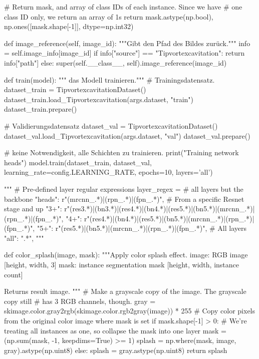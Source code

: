         # Return mask, and array of class IDs of each instance. Since we have
        # one class ID only, we return an array of 1s
        return mask.astype(np.bool), np.ones([mask.shape[-1]], dtype=np.int32)

    def image_reference(self, image_id):
        """Gibt den Pfad des Bildes zurück."""
        info = self.image_info[image_id]
        if info["source"] == "Tipvortexcavitation":
            return info["path"]
        else:
            super(self.__class__, self).image_reference(image_id)

   
def train(model):
    """ das Modell trainieren."""
    # Trainingsdatensatz.
    dataset_train = TipvortexcavitationDataset()
    dataset_train.load_Tipvortexcavitation(args.dataset, "train")
    dataset_train.prepare()

    # Validierungsdatensatz
    dataset_val = TipvortexcavitationDataset()
    dataset_val.load_Tipvortexcavitation(args.dataset, "val")
    dataset_val.prepare()

    
    
    
    
    # keine Notwendigkeit, alle Schichten zu trainieren. 
    print("Training network heads")
    model.train(dataset_train, dataset_val,
                learning_rate=config.LEARNING_RATE,
                epochs=10,
                layers='all')
    
    """
    # Pre-defined layer regular expressions
        layer_regex = {
            # all layers but the backbone
            "heads": r"(mrcnn\_.*)|(rpn\_.*)|(fpn\_.*)",
            # From a specific Resnet stage and up
            "3+": r"(res3.*)|(bn3.*)|(res4.*)|(bn4.*)|(res5.*)|(bn5.*)|(mrcnn\_.*)|(rpn\_.*)|(fpn\_.*)",
            "4+": r"(res4.*)|(bn4.*)|(res5.*)|(bn5.*)|(mrcnn\_.*)|(rpn\_.*)|(fpn\_.*)",
            "5+": r"(res5.*)|(bn5.*)|(mrcnn\_.*)|(rpn\_.*)|(fpn\_.*)",
            # All layers
            "all": ".*",
        }
    """


def color_splash(image, mask):
    """Apply color splash effect.
    image: RGB image [height, width, 3]
    mask: instance segmentation mask [height, width, instance count]

    Returns result image.
    """
    # Make a grayscale copy of the image. The grayscale copy still
    # has 3 RGB channels, though.
    gray = skimage.color.gray2rgb(skimage.color.rgb2gray(image)) * 255
    # Copy color pixels from the original color image where mask is set
    if mask.shape[-1] > 0:
        # We're treating all instances as one, so collapse the mask into one layer
        mask = (np.sum(mask, -1, keepdims=True) >= 1)
        splash = np.where(mask, image, gray).astype(np.uint8)
    else:
        splash = gray.astype(np.uint8)
    return splash


